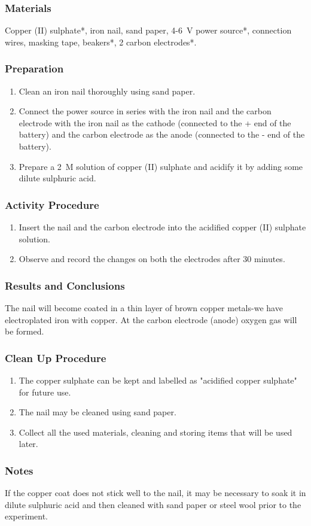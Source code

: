 \subsubsection*{Materials}
Copper (II) sulphate*, iron nail, sand paper, 4-6~V  power source*, connection wires, masking tape, beakers*, 2 carbon electrodes*.

\subsubsection*{Preparation}
\begin{enumerate}
\item{Clean an iron nail thoroughly using sand paper.}
\item{Connect the power source in series with the iron nail and the carbon electrode with the iron nail as the cathode (connected to the + end of the battery) and the carbon electrode as the anode (connected to the - end of the battery).}
\item{Prepare a 2~M solution of copper (II) sulphate and acidify it by adding some dilute sulphuric acid.}
\end{enumerate}

\subsubsection*{Activity Procedure}
\begin{enumerate}
\item{Insert the nail and the carbon electrode into the acidified copper (II) sulphate solution.}
\item{Observe and record the changes on both the electrodes after 30 minutes.}
\end{enumerate}

\subsubsection*{Results and Conclusions}
The nail will become coated in a thin layer of brown copper metals-we have electroplated iron with copper. At the carbon electrode (anode) oxygen gas will be formed.

\subsubsection*{Clean Up Procedure}
\begin{enumerate}
\item{The copper sulphate can be kept and labelled as "acidified copper sulphate" for future use.}
\item{The nail may be cleaned using sand paper.}
\item{Collect all the used materials, cleaning and storing items that will be used later.}
\end{enumerate}

\subsubsection*{Notes}
If the copper coat does not stick well to the nail, it may be necessary to soak it in dilute sulphuric acid and then cleaned with sand paper or steel wool prior to the experiment.
